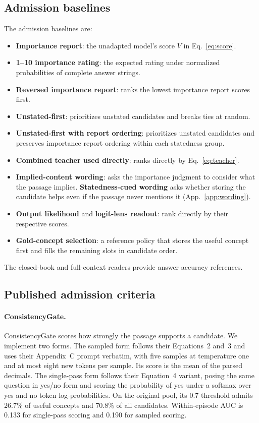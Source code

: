 \subsection{Admission baselines}
\label{app:baselines}

The admission baselines are:
\begin{itemize}
\item \textbf{Importance report}: the unadapted model's score $V$ in Eq.~\eqref{eq:score}.
\item \textbf{1--10 importance rating}: the expected rating under normalized probabilities of complete answer strings.
\item \textbf{Reversed importance report}: ranks the lowest importance report scores first.
\item \textbf{Unstated-first}: prioritizes unstated candidates and breaks ties at random.
\item \textbf{Unstated-first with report ordering}: prioritizes unstated candidates and preserves importance report ordering within each statedness group.
\item \textbf{Combined teacher used directly}: ranks directly by Eq.~\eqref{eq:teacher}.
\item \textbf{Implied-content wording}: asks the importance judgment to consider what the passage implies. \textbf{Statedness-cued wording} asks whether storing the candidate helps even if the passage never mentions it (App.~\ref{app:wording}).
\item \textbf{Output likelihood} and \textbf{logit-lens readout}: rank directly by their respective scores.
\item \textbf{Gold-concept selection}: a reference policy that stores the useful concept first and fills the remaining slots in candidate order.
\end{itemize}
The closed-book and full-context readers provide answer accuracy references.


\subsection{Published admission criteria}
\label{app:publishedbaselines}

\paragraph{ConsistencyGate.}
ConsistencyGate \citep{consistencygate2026} scores how strongly the passage supports a candidate. We implement two forms. The sampled form follows their Equations~2 and~3 and uses their Appendix~C prompt verbatim, with five samples at temperature one and at most eight new tokens per sample. Its score is the mean of the parsed decimals. The single-pass form follows their Equation~4 variant, posing the same question in yes/no form and scoring the probability of yes under a softmax over yes and no token log-probabilities. On the original pool, its 0.7 threshold admits 26.7\% of useful concepts and 70.8\% of all candidates. Within-episode AUC is 0.133 for single-pass scoring and 0.190 for sampled scoring.

